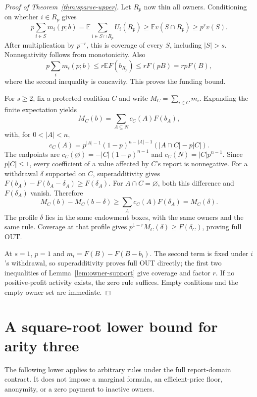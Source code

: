 \documentclass[11pt]{article}
\theoremstyle{definition}\newtheorem{definition}[theorem]{Definition}
\theoremstyle{remark}\newtheorem{remark}[theorem]{Remark}
\begin{document}
\begin{proof}[Proof of Theorem~\ref{thm:sparse-upper}]
Let $R_p$ now thin all owners. Conditioning on whether $i\in R_p$ gives
\[
 p\sum_{i\in S}m_i(p;b)
 =\mathbb E\sum_{i\in S\cap R_p}U_i(R_p)
 \ge\mathbb E v(S\cap R_p)\ge p^r v(S).
\]
After multiplication by $p^{-r}$, this is coverage of every $S$, including
$|S|>s$. Nonnegativity follows from monotonicity. Also
\[
 p\sum_i m_i(p;b)\le r\mathbb E F(b_{R_p})
 \le rF(pB)=rpF(B),
\]
where the second inequality is concavity. This proves the funding bound.

For $s\ge2$, fix a protected coalition $C$ and write $M_C=\sum_{i\in C}m_i$.
Expanding the finite expectation yields
\[
 M_C(b)=\sum_{A\subseteq N}c_C(A)F(b_A),
\]
with, for $0<|A|<n$,
\begin{equation}\label{eq:coefficient}
 c_C(A)=p^{|A|-1}(1-p)^{n-|A|-1}(|A\cap C|-p|C|).
\end{equation}
The endpoints are $c_C(\varnothing)=-|C|(1-p)^{n-1}$ and
$c_C(N)=|C|p^{n-1}$. Since $p|C|\le1$, every coefficient of a value affected
by $C$'s report is nonnegative. For a withdrawal $\delta$ supported on $C$,
superadditivity gives
$F(b_A)-F(b_A-\delta_A)\ge F(\delta_A)$.
For $A\cap C=\varnothing$, both this difference and $F(\delta_A)$ vanish.
Therefore
\[
 M_C(b)-M_C(b-\delta)\ge\sum_A c_C(A)F(\delta_A)=M_C(\delta).
\]
The profile $\delta$ lies in the same endowment boxes, with the same owners
and the same rule. Coverage at that profile gives
$p^{1-r}M_C(\delta)\ge F(\delta_C)$, proving full OUT.

At $s=1$, $p=1$ and $m_i=F(B)-F(B-b_i)$. The second term is fixed under
$i$'s withdrawal, so superadditivity proves full OUT directly; the first two
inequalities of Lemma~\ref{lem:owner-support} give coverage and factor $r$.
If no positive-profit activity exists, the zero rule suffices. Empty
coalitions and the empty owner set are immediate.
\end{proof}

\section{A square-root lower bound for arity three}\label{sec:lower}
The following lower applies to arbitrary rules under the full report-domain
contract. It does not impose a marginal formula, an efficient-price floor,
anonymity, or a zero payment to inactive owners.
\end{document}
